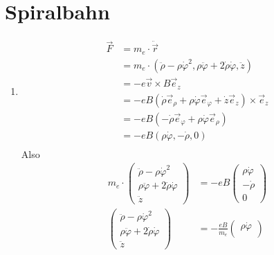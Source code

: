 \documentclass[sectionformat=aufgabe]{gadsescript}
\begin{document}
\maketitle

\section{Spiralbahn}
\begin{enumerate}[label=\alph*)]
	\item
		\begin{align*}
			\vec F &= m_e \cdot \ddot {\vec r} \\
			       &= m_e \cdot \left( \ddot \rho - \rho \dot \varphi^2, \rho \ddot \varphi + 2 \dot \rho \dot \varphi, \ddot z  \right) \\
			       &= -e \vec v \times B \vec e_z \\
			       &= -e B \left( \dot \rho \vec e_\rho + \rho \dot \varphi \vec e_\varphi + \dot z \vec e_z \right) \times  \vec e_z \\
			       &= -e B \left( - \dot \rho \vec e_\varphi + \rho \dot \varphi \vec e_\rho \right)\\
			       &= -e B \left( \rho \dot \varphi , - \dot \rho, 0 \right)\\
		\end{align*}
		Also
		\begin{align*}
		       m_e \cdot %
		       \begin{pmatrix} %
			       \ddot \rho - \rho \dot \varphi^2 \\%
			       \rho \ddot \varphi + 2 \dot \rho \dot \varphi \\%
			       \ddot z%
		       \end{pmatrix} %
		       &= -e B%
		       \begin{pmatrix} %
			       \rho \dot \varphi \\%
			       - \dot \rho \\%
			       0
		       \end{pmatrix}\\%
		       \begin{pmatrix} %
			       \ddot \rho - \rho \dot \varphi^2 \\
			       \rho \ddot \varphi + 2 \dot \rho \dot \varphi \\
			       \ddot z
		       \end{pmatrix} %
		       &= -\frac{e B}{ m_e } 
		       \begin{pmatrix} 
			       \rho \dot \varphi \\

\end{pmatrix}
\end{align*}
\end{enumerate}
\end{document}
